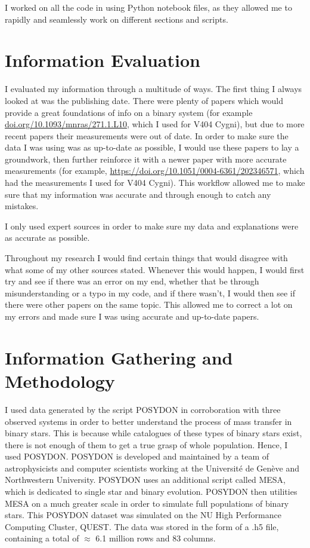 \documentclass[12pt, a4paper]{article}
\begin{document}
   I worked on all the code in using Python notebook files, as they allowed me to rapidly and seamlessly work on different sections and scripts.
\section{Information Evaluation}
    I evaluated my information through a multitude of ways. The first thing I always looked at was the publishing date. There were plenty of papers which would provide a great foundations of info on a binary system (for example \url{doi.org/10.1093/mnras/271.1.L10}, which I used for V404 Cygni), but due to more recent papers their measurements were out of date. In order to make sure the data I was using was as up-to-date as possible, I would use these papers to lay a groundwork, then further reinforce it with a newer paper with more accurate measurements (for example, \url{https://doi.org/10.1051/0004-6361/202346571}, which had the measurements I used for V404 Cygni). This workflow allowed me to make sure that my information was accurate and through enough to catch any mistakes.

    I only used expert sources in order to make sure my data and explanations were as accurate as possible.

    Throughout my research I would find certain things that would disagree with what some of my other sources stated. Whenever this would happen, I would first try and see if there was an error on my end, whether that be through misunderstanding or a typo in my code, and if there wasn't, I would then see if there were other papers on the same topic. This allowed me to correct a lot on my errors and made sure I was using accurate and up-to-date papers. 

\section{Information Gathering and Methodology}

    I used data generated by the script POSYDON in corroboration with three observed systems in order to better understand the process of mass transfer in binary stars. This is because while catalogues of these types of binary stars exist, there is not enough of them to get a true grasp of whole population. Hence, I used POSYDON. POSYDON is developed and maintained by a team of astrophysicists and computer scientists working at the Université de Genève and Northwestern University. POSYDON uses an additional script called MESA, which is dedicated to single star and binary evolution. POSYDON then utilities MESA on a much greater scale in order to simulate full populations of binary stars. This POSYDON dataset was simulated on the NU High Performance Computing Cluster, QUEST. The data was stored in the form of a .h5 file, containing a total of $\approx$ 6.1 million rows and 83 columns.
\end{document}
